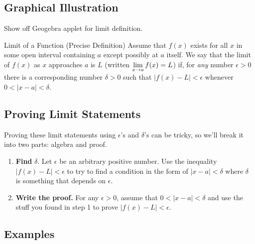 \subsection*{Graphical Illustration}

Show off Geogebra applet for limit definition.

\begin{defn}{Limit of a Function (Precise Definition)}
Assume that $f(x)$ exists for all $x$ in some open interval containing $a$ except possibly at $a$ itself. We say that the limit of $f(x)$ as $x$ approaches $a$ is $L$ (written $\displaystyle \lim_{x\to a}f(x)=L$) if, for \textit{any} number $\epsilon>0$ there is a corresponding number $\delta>0$ such that $|f(x)-L|<\epsilon$ whenever $0<|x-a|<\delta$.
\end{defn}

\subsection*{Proving Limit Statements}

Proving these limit statements using $\epsilon$'s and $\delta$'s can be tricky, so we'll break it into two parts: algebra and proof.

\begin{enumerate}
  \item \textbf{Find} $\delta$. Let $\epsilon$ be an arbitrary positive number. Use the inequality $|f(x)-L|<\epsilon$ to try to find a condition in the form of $|x-a|<\delta$ where $\delta$ is something that depends on $\epsilon$.
  \item \textbf{Write the proof.} For any $\epsilon>0$, assume that $0<|x-a|<\delta$ and use the stuff you found in step 1 to prove $|f(x)-L|<\epsilon$.
\end{enumerate}

\subsection*{Examples}

